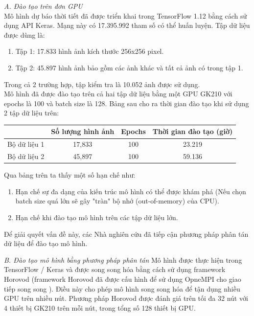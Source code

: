 \documentclass[11pt,a4paper]{article}
\numberwithin{equation}{subsection}
\numberwithin{figure}{subsection}
\numberwithin{table}{subsection}
\begin{document}
\textit{A. Đào tạo trên đơn GPU}\\
Mô hình dự báo thời tiết đã được triển khai trong TensorFlow 1.12 bằng cách sử dụng API Keras. Mạng này có 17.395.992 tham số có thể huấn luyện. Tập dữ liệu được dùng là: 
\begin{enumerate}[-]
	\item Tập 1: 17.833 hình ảnh kích thước 256x256 pixel.
	\item Tập 2: 45.897 hình ảnh bảo gồm các ảnh khác và tất cả ảnh có trong tập 1.
\end{enumerate}
Trong cả 2 trường hợp, tập kiểm tra là 10.052 ảnh được sử dụng.\\

Mô hình đã được đào tạo trên cả hai tập dữ liệu bằng một GPU GK210 với epochs là 100 và batch size là 128. Bảng sau cho ra thời gian đào tạo khi sử dụng 2 tập dữ liệu trên:\\
\begin{center}


\begin{tabular}{|c|c|c|c|}
\hline
             & \textbf{Số lượng hình ảnh} & \textbf{Epochs} & \textbf{Thời gian đào tạo (giờ)} \\ \hline
Bộ dữ liệu 1 & 17,833                     & 100             & 23.219                           \\ \hline
Bộ dữ liệu 2 & 45,897                     & 100             & 59.136                           \\ \hline
\end{tabular}
\end{center}

Qua bảng trên ta thấy một số hạn chế như:
\begin{enumerate}[-]
	\item Hạn chế sự đa dạng của kiến trúc mô hình có thể được khám phá (Nếu chọn batch size quá lớn sẽ gây "tràn" bộ nhớ (out-of-memory) của CPU).
	\item Hạn chế khi đào tạo mô hình trên các tập dữ liệu lớn.
\end{enumerate}
Để giải quyết vấn đề này, các Nhà nghiên cứu đã tiếp cận phương pháp phân tán dữ liệu để đào tạo mô hình.

\textit{B. Đào tạo mô hình bằng phương pháp phân tán}
Mô hình được thực hiện trong TensorFlow / Keras và được song song hóa bằng cách sử dụng framework Horovod (framework Horovod đã được cấu hình để sử dụng OpneMPI cho giao tiếp song song ). Điều này cho phép mô hình song song hóa để tận dụng nhiều GPU trên nhiều nút. Phương pháp Horovod được đánh giá trên tối đa 32 nút với 4 thiết bị GK210 trên mỗi nút, trong tổng số 128 thiết bị GPU.\\
\end{document}
